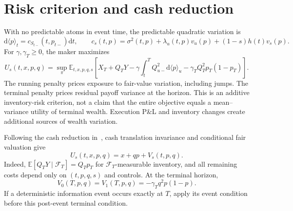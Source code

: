\documentclass[11pt]{article}
\newcommand{\E}{\mathbb E}
\newcommand{\1}{\mathbf 1}
\newcommand{\dd}{\mathrm d}
\newcommand{\F}{\mathcal F}
\begin{document}
\section{Risk criterion and cash reduction}
With no predictable atoms in event time, the predictable quadratic variation is
\begin{equation}
 \dd\langle p\rangle_t=c_{S_{t-}}(t,p_{t-})\dd t,
 \qquad
 c_s(t,p)=\sigma^2(t,p)+\lambda_u(t,p)v_u(p)+(1-s)h(t)v_s(p).
 \label{eq:variance}
\end{equation}
For $\gamma,\gamma_T\ge0$, the maker maximizes
\begin{equation}
 U_s(t,x,p,q)=\sup_{\pi}\E_{t,x,p,q,s}\left[
 X_T+Q_TY-\gamma\int_t^T Q_{u-}^2\dd\langle p\rangle_u
 -\gamma_TQ_T^2p_T(1-p_T)\right].
 \label{eq:objective}
\end{equation}
The running penalty prices exposure to fair-value variation, including jumps.
The terminal penalty prices residual payoff variance at the horizon.
This is an additive inventory-risk criterion, not a claim that the entire
objective equals a mean--variance utility of terminal wealth. Execution P\&L
and inventory changes create additional sources of wealth variation.

Following the cash reduction in~\cite{feilnendel2026}, cash translation
invariance and conditional fair valuation give
\begin{equation}
 \boxed{U_s(t,x,p,q)=x+qp+V_s(t,p,q).}
\end{equation}
Indeed, $\E[Q_TY\mid\F_T]=Q_Tp_T$ for $\F_T$-measurable inventory, and
all remaining costs depend only on $(t,p,q,s)$ and controls.
At the terminal horizon,
\begin{equation}
 \boxed{V_0(T,p,q)=V_1(T,p,q)=-\gamma_Tq^2p(1-p).}
 \label{eq:terminal}
\end{equation}
If a deterministic information event occurs exactly at $T$, apply its event
condition before this post-event terminal condition.
\end{document}
